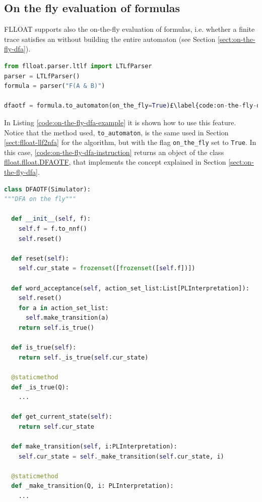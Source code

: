 \subsection{On the fly evaluation of \LLf formulas}\label{sect:flloat-on-the-fly-evaluation}
FLLOAT supports also the on-the-fly evaluation of \LLf formulas, i.e. whether a finite trace satisfies an \LLf without building the entire automaton (see Section \ref{sect:on-the-fly-dfa}).

\begin{lstlisting}[language=Python, style=Python, escapechar = £, label={code:on-the-fly-dfa-example}, caption={From \LLf to \NFA}]
from flloat.parser.ltlf import LTLfParser
parser = LTLfParser()
formula = parser("F(A & B)")

dfaotf = formula.to_automaton(on_the_fly=True)£\label{code:on-the-fly-dfa-instruction}£

\end{lstlisting}

In Listing \ref{code:on-the-fly-dfa-example} it is shown how to use this feature. Notice that the method used, \texttt{to\_automaton}, is the same used in Section \ref{sect:flloat-llf2nfa} for the \LDLfToNFA algorithm, but with the flag \texttt{on\_the\_fly} set to \texttt{True}. In this case, \ref{code:on-the-fly-dfa-instruction} returns an object of the class \href{https://github.com/MarcoFavorito/flloat/blob/0.1.4/flloat/flloat.py#L164-L246}{flloat.flloat.DFAOTF}, that implements the concept explained in Section \ref{sect:on-the-fly-dfa}.

\begin{lstlisting}[language=Python, style=Python, escapechar = £, label={code:DFAOTF}, caption={The class \texttt{DFAOTF}, that implements on-the-fly \LLf formula evaluation.}]
class DFAOTF(Simulator):
"""DFA on the fly"""

  def __init__(self, f):
    self.f = f.to_nnf()
    self.reset()

  def reset(self):
    self.cur_state = frozenset([frozenset([self.f])])

  def word_acceptance(self, action_set_list:List[PLInterpretation]):
    self.reset()
    for a in action_set_list:
      self.make_transition(a)
    return self.is_true()

  def is_true(self):
    return self._is_true(self.cur_state)

  @staticmethod
  def _is_true(Q):
    ...

  def get_current_state(self):
    return self.cur_state

  def make_transition(self, i:PLInterpretation):
    self.cur_state = self._make_transition(self.cur_state, i)

  @staticmethod
  def _make_transition(Q, i: PLInterpretation):
    ...
\end{lstlisting}

